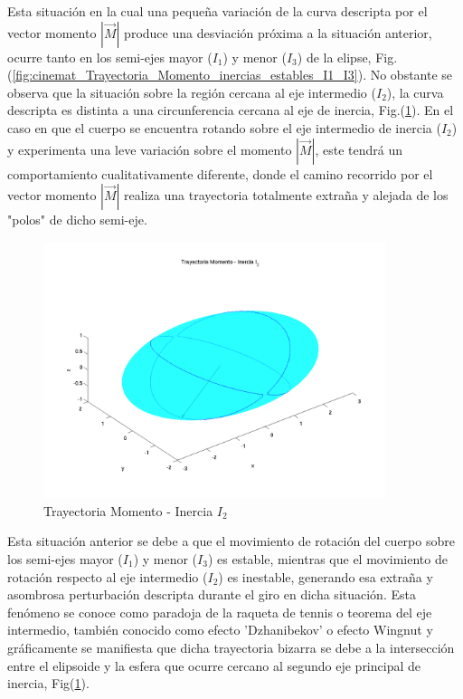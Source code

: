\documentclass[oneside,a4paper,english,links]{amca}
\begin{document}
Esta situaci\'on en la cual una peque\~na variaci\'on de la curva descripta por el vector momento $|\vec{M}|$ produce una desviaci\'on pr\'oxima a la situaci\'on anterior, ocurre tanto en los semi-ejes mayor ($I_1$) y menor ($I_3$) de la elipse, Fig.(\ref{fig:cinemat_Trayectoria_Momento_inercias_estables_I1_I3}). No obstante se observa que la situaci\'on sobre la regi\'on cercana al eje intermedio ($I_2$), la curva descripta es distinta a una circunferencia cercana al eje de inercia, Fig.(\ref{fig:cinemat_Trayectoria_Momento_Inercia I_2}). En el caso en que el cuerpo se encuentra rotando sobre el eje intermedio de inercia ($I_2$) y experimenta una leve variaci\'on sobre el momento $|\vec{M}|$, este tendr\'a un comportamiento cualitativamente diferente, donde el camino recorrido por el vector momento $|\vec{M}|$ realiza una trayectoria totalmente extra\~na y alejada de los "polos" de dicho semi-eje.

\begin{figure}[H]
\centering
\includegraphics[width=10cm]{Figuras/Trayectoria Momento - Inercia I_2.png}
\caption{Trayectoria Momento - Inercia $I_2$}
\label{fig:cinemat_Trayectoria_Momento_Inercia I_2}
\end{figure}

Esta situaci\'on anterior se debe a que el movimiento de rotaci\'on del cuerpo sobre los semi-ejes mayor ($I_1$) y menor ($I_3$) es estable, mientras que el movimiento de rotaci\'on respecto al eje intermedio ($I_2$) es inestable, generando esa extra\~na y asombrosa perturbaci\'on descripta durante el giro en dicha situaci\'on. Esta fen\'omeno se conoce como paradoja de la raqueta de tennis o teorema del eje intermedio, tambi\'en conocido como efecto 'Dzhanibekov' o efecto Wingnut y gr\'aficamente se manifiesta que dicha trayectoria bizarra se debe a la intersecci\'on entre el elipsoide y la esfera que ocurre cercano al segundo eje principal de inercia, Fig(\ref{fig:cinemat_Trayectoria_Momento_Inercia I_2}).
\end{document}
